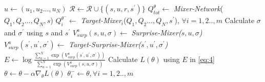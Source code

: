 \documentclass{article}
\begin{document}
\begin{multicols}{2}
\begin{algorithm}[H]
\begin{algorithmic}[1]
      \State $u \xleftarrow[]{} (u_{1},u_{2}...,u_{N})$
      \State $\mathcal{R} \xleftarrow[]{} \mathcal{R} \cup \{(s,u,r,s^{'})\}$
            \State $Q_{tot}^{\theta} \xleftarrow[]{}$ \textit{Mixer-Network}($Q_{1},Q_{2}...,Q_{N},s$)
            \State $Q_{i}^{\theta^{-}} \xleftarrow[]{}$ \textit{Target-Mixer}$_{i}$($Q_{1},Q_{2}...,Q_{N},s^{'}$),  $\forall i=1,2..,m$
            \State Calculate $\sigma$ and $\sigma^{'}$ using $s$ and $s^{'}$
            \State $V_{surp}^{a}(s,u,\sigma) \xleftarrow[]{}$ \textit{Surprise-Mixer($s,u,\sigma$)}
            \State $V_{surp}^{a}(s^{'},u^{'},\sigma^{'}) \xleftarrow[]{}$ \textit{Target-Surprise-Mixer($s^{'},u^{'},\sigma^{'}$)}
            \State $E \xleftarrow[]{} \log \frac{\sum_{a=1}^{N} \exp{(V^{a}_{surp}(s^{'},u^{'},\sigma^{'}))}}{\sum_{a=1}^{N} \exp{(V^{a}_{surp}(s,u,\sigma))}}$
            \State Calculate $L(\theta)$ using $E$ in \autoref{eq:4}
            \State $\theta \xleftarrow[]{} \theta - \alpha \nabla_{\theta}L(\theta)$
        \EndFor
    \EndIf
        \State $\theta_{i}^{-} \xleftarrow[]{} \theta, \forall i=1,2..,m$
    \EndIf
  \EndFor

\end{algorithmic}
\end{algorithm}


\end{multicols}
\end{document}
